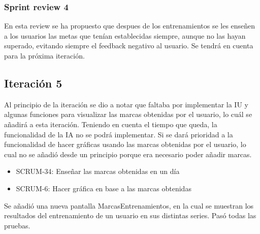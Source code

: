 \subsubsection{Sprint review 4}

En esta review se ha propuesto que despues de los entrenamientos se les enseñen a los usuarios las metas que tenían establecidas siempre, aunque no las hayan superado, evitando siempre el feedback negativo al usuario. Se tendrá en cuenta para la próxima iteración.

\subsection{Iteración 5}

Al principio de la iteración se dio a notar que faltaba por implementar la IU y algunas funciones para visualizar las marcas obtenidas por el usuario, lo cuál se añadirá a esta iteración. Teniendo en cuenta el tiempo que queda, la funcionalidad de la IA no se podrá implementar. Si se dará prioridad a la funcionalidad de hacer gráficas usando las marcas obtenidas por el usuario, lo cual no se añadió desde un principio porque era necesario poder añadir marcas.

\begin{itemize}
	\item SCRUM-34: Enseñar las marcas obtenidas en un día
	\item SCRUM-6: Hacer gráfica en base a las marcas obtenidas
\end{itemize}


\hspace{0.5cm}

Se añadió una nueva pantalla MarcasEntrenamientos, en la cual se muestran los resultados del entrenamiento de un usuario en sus distintas series. Pasó todas las pruebas.

\hspace{0.5cm}


